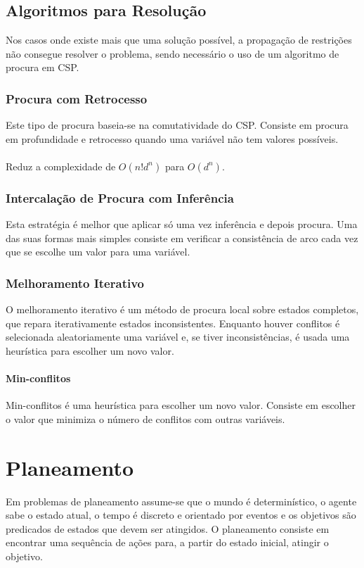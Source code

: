 \documentclass[10pt,a4paper]{report}
\begin{document}
\section{Algoritmos para Resolução}
Nos casos onde existe mais que uma solução possível, a propagação de restrições não consegue resolver o problema, sendo necessário o uso de um algoritmo de procura em CSP.
\subsection{Procura com Retrocesso}
Este tipo de procura baseia-se na comutatividade do CSP. Consiste em procura em profundidade e retrocesso quando uma variável não tem valores possíveis.\\
\\
Reduz a complexidade de $O(n!d^n)$ para $O(d^n)$.
\subsection{Intercalação de Procura com Inferência}
Esta estratégia é melhor que aplicar só uma vez inferência e depois procura. Uma das suas formas mais simples consiste em verificar a consistência de arco cada vez que se escolhe um valor para uma variável.
\subsection{Melhoramento Iterativo}
O melhoramento iterativo é um método de procura local sobre estados completos, que repara iterativamente estados inconsistentes. Enquanto houver conflitos é selecionada aleatoriamente uma variável e, se tiver inconsistências, é usada uma heurística para escolher um novo valor.
\subsubsection{Min-conflitos}
Min-conflitos é uma heurística para escolher um novo valor. Consiste em escolher o valor que minimiza o número de conflitos com outras variáveis.

\chapter{Planeamento}
Em problemas de planeamento assume-se que o mundo é determinístico, o agente sabe o estado atual, o tempo é discreto e orientado por eventos e os objetivos são predicados de estados que devem ser atingidos. O planeamento consiste em encontrar uma sequência de ações para, a partir do estado inicial, atingir o objetivo.
\end{document}
